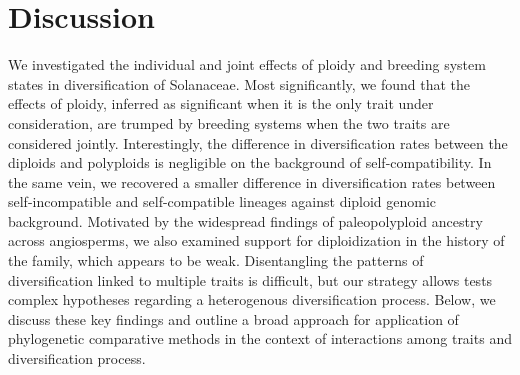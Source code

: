 \section{Discussion}

%
%
% 
%

We investigated the individual and joint effects of ploidy and breeding system states in diversification of Solanaceae.
Most significantly, we found that the effects of ploidy, inferred as significant when it is the only trait under consideration, are trumped by breeding systems when the two traits are considered jointly.
Interestingly, the difference in diversification rates between the diploids and polyploids is negligible on the background of self-compatibility.
In the same vein, we recovered a smaller difference in diversification rates between self-incompatible and self-compatible lineages against diploid genomic background. %
Motivated by the widespread findings of paleopolyploid ancestry across angiosperms, we also examined support for diploidization in the history of the family, which appears to be weak. %
Disentangling the patterns of diversification linked to multiple traits is difficult, but our strategy allows tests complex hypotheses regarding a heterogenous diversification process.
Below, we discuss these key findings and outline a broad approach for application of phylogenetic comparative methods in the context of interactions among traits and diversification process. 


